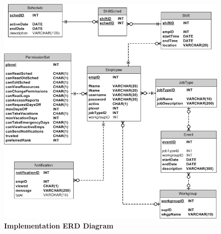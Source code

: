 \documentclass[letterpaper,12pt]{report}
\begin{document}
\newpage
\begin{figure}[ImplementationERD]
 \centering
 \includegraphics[scale=0.6,trim=20mm 10mm 25mm 0mm]{diagrams/WebAgendaERDimplementation.png}
 \caption{\small
\textbf{Implementation ERD Diagram}}\label{fig:implemERD}
\end{figure}


\pagebreak
\end{document}
